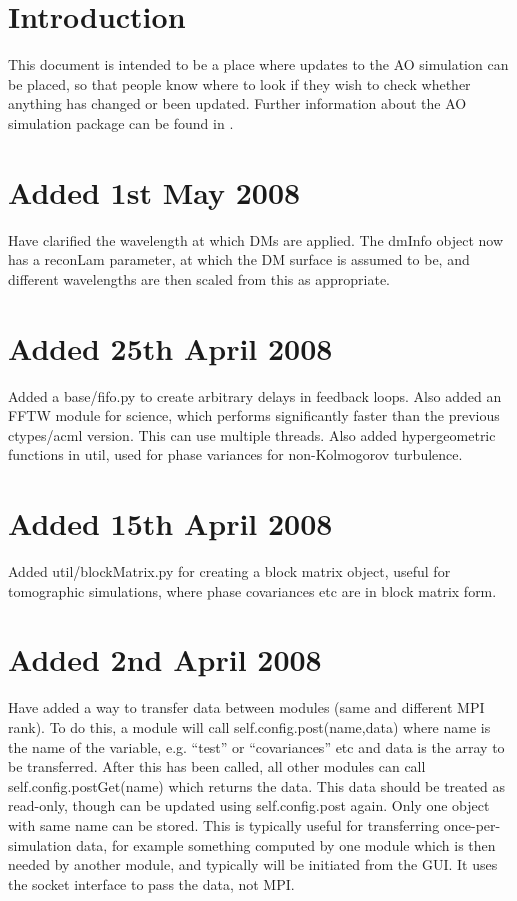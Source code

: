 \documentclass{article}
\begin{document}


\section{Introduction}
This document is intended to be a place where updates to the AO
simulation can be placed, so that people know where to look if they
wish to check whether anything has changed or been updated.  Further
information about the AO simulation package can be found in
\citet{overview}.
\section{Added 1st May 2008}
Have clarified the wavelength at which DMs are applied.  The dmInfo
object now has a reconLam parameter, at which the DM surface is
assumed to be, and different wavelengths are then scaled from this as
appropriate.  

\section{Added 25th April 2008}
Added a base/fifo.py to create arbitrary delays in feedback loops.
Also added an FFTW module for science, which performs significantly
faster than the previous ctypes/acml version.  This can use multiple
threads.  Also added hypergeometric functions in util, used for phase
variances for non-Kolmogorov turbulence.

\section{Added 15th April 2008}
Added util/blockMatrix.py for creating a block matrix object, useful
for tomographic simulations, where phase covariances etc are in block
matrix form.

\section{Added 2nd April 2008}
Have added a way to transfer data between modules (same and different
MPI rank).  To do this, a module will call self.config.post(name,data)
where name is the name of the variable, e.g. ``test'' or
``covariances'' etc and data is the array to be transferred.  After
this has been called, all other modules can call
self.config.postGet(name) which returns the data.  This data should be
treated as read-only, though can be updated using self.config.post
again.  Only one object with same name can be stored.  This is
typically useful for transferring once-per-simulation data, for
example something computed by one module which is then needed by
another module, and typically will be initiated from the GUI.  It uses
the socket interface to pass the data, not MPI.
\end{document}
